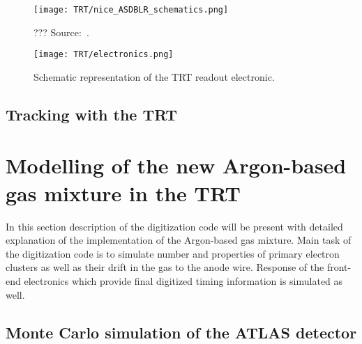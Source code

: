 \begin{figure}
\centering
\texttt{[image: TRT/nice\_ASDBLR\_schematics.png]}
\caption{ 
 ??? Source:~\cite{Aad:2008zzm}.
}
\label{fig:nice_asdblr_schematics}
\end{figure}


\begin{figure}
\centering
\texttt{[image: TRT/electronics.png]}
\caption{ 
 Schematic representation of the TRT readout electronic.
}
\label{fig:electronics}
\end{figure}



\subsection{Tracking with the TRT}

\section{Modelling of the new Argon-based gas mixture in the TRT}
\label{sec:digi_argon}

In this section description of the digitization code will be present with detailed explanation of the implementation of the Argon-based gas mixture.
Main task of the digitization code is to simulate number and properties of primary electron clusters as well as their drift in the gas to the anode wire.
Response of the front-end electronics which provide final digitized timing information is simulated as well.

\subsection{Monte Carlo simulation of the ATLAS detector}

